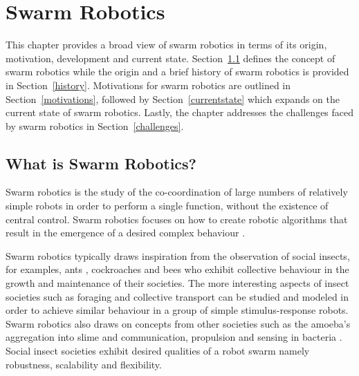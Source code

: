 
\chapter{Swarm Robotics}
\label{chap:first}


This chapter provides a broad view of swarm robotics in terms of its origin, motivation, development and current state.
Section~\ref{sec:first:definitionswarmrobotics} defines the concept of swarm robotics while the origin and a brief history of swarm robotics is provided in Section~\ref{history}. Motivations for swarm robotics are outlined in Section~\ref{motivations}, followed by Section~\ref{currentstate} which expands on the current state of swarm robotics. Lastly, the chapter addresses the challenges faced by swarm robotics in Section~\ref{challenges}.


\section{What is Swarm Robotics?}
\label{sec:first:definitionswarmrobotics}

Swarm robotics is the study of the co-coordination of large numbers of relatively simple robots in order to perform a single function, without the existence of central control. Swarm robotics focuses on how to create robotic algorithms that result in the emergence of a desired complex behaviour \cite{csahin2005swarm}.

Swarm robotics typically draws inspiration from the observation of social insects, for examples, ants \cite{hoff2010two}, cockroaches \cite{garnier2005aggregation} and bees \cite{lee2012foraging} who exhibit collective behaviour in the growth and maintenance of their societies\cite{bailishive, wilson1971insect}. The more interesting aspects of insect societies such as foraging and collective transport can be studied and modeled in order to achieve similar behaviour in a group of simple stimulus-response robots. Swarm robotics also draws on concepts from other societies such as the amoeba's aggregation into slime \cite{schmickl2007navigation} and communication, propulsion and sensing in bacteria \cite{dhariwal2004bacterium,martel2010using}. Social insect societies exhibit desired qualities of a robot swarm namely robustness, scalability and flexibility.

